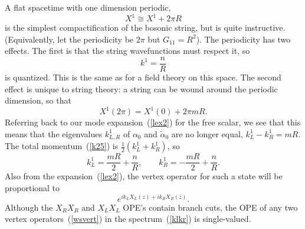 
A flat spacetime with one dimension periodic,
\begin{equation}
X^{1} \cong X^{1} + 2\pi R
\end{equation}
is the simplest compactification of the bosonic string, but is
quite instructive.
(Equivalently, let the periodicity be $2\pi$ but $G_{11} = R^2$).  The
periodicity has two effects.  The first is that the string
wavefunctions must respect it, so \begin{equation}
k^{1} = \frac{n}{R} \label{k25}
\end{equation}
is quantized.  This is the same as for a field theory on this space.
The second effect is unique to string theory: a string can be wound
around the periodic dimension, so that
\begin{equation}
X^{1} (2\pi) = X^{1} (0) + 2\pi m R.
\end{equation}
Referring back to our mode expansion~(\ref{lex2}) for the free
scalar, we see that this means that the eigenvalues $k^{1}_{L,R}$
of $\alpha_0$ and $\tilde \alpha_0$ are no longer equal,
$k^{1}_L - k^{1}_R = m R$.  The total momentum~(\ref{k25}) is
$\frac{1}{2}(k^{1}_L + k^{1}_R)$, so 
\begin{equation}
k^{1}_L = \frac{mR}{2} + \frac{n}{R}, \qquad
k^{1}_R = -\frac{mR}{2} + \frac{n}{R}. \label{klkr}
\end{equation}
Also from the expansion~(\ref{lex2}), the vertex operator for
such a state will be proportional to
\begin{equation}
e^{i k_L X_L(z) + i k_R X_R(\bar z)}. \label{wsvert}
\end{equation}
Although the $X_R X_R$ and $X_L X_L$
OPE's contain branch cuts, the OPE of any two vertex
operators~(\ref{wsvert}) in the spectrum~(\ref{klkr}) is
single-valued.

